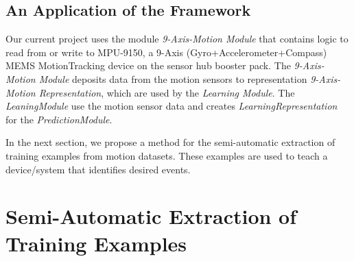 \documentclass[]{IEEEtran}
\begin{document}


\subsection{An Application of the Framework}

Our current project uses 
the module {\em 
9-Axis-Motion Module} that contains logic to read from or write to MPU-9150, a 9-Axis 
(Gyro+Accelerometer+Compass) MEMS MotionTracking device on the sensor hub booster pack. The {\em 
9-Axis-Motion Module} deposits data from the motion sensors to 
representation {\em 9-Axis-Motion Representation}, which are used by the {\em 
Learning Module}. The {\em LeaningModule} use the motion sensor data and creates {\em LearningRepresentation} for the {\em PredictionModule}. 

\par 

In the next section, we propose a method for the semi-automatic extraction of training examples from motion datasets. These examples are used to teach a device/system that identifies desired events. 

\section{Semi-Automatic Extraction of  Training Examples}
\label{sec:SemiAutomaticExtractionOfTrainingVectors}
\end{document}

